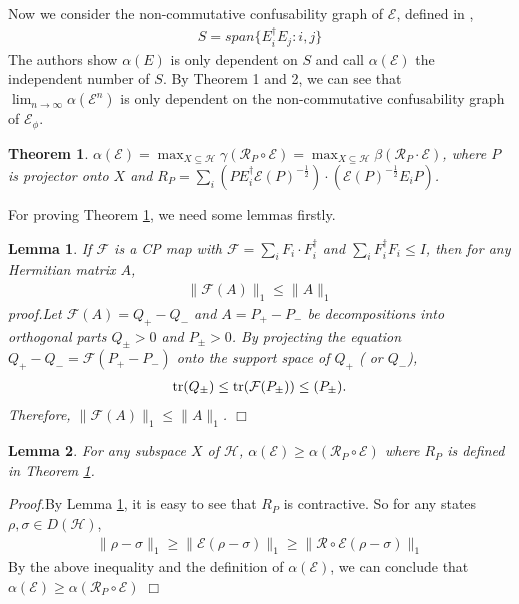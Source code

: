 \documentclass{article}
\def\R{\ensuremath{\mathfrak{R}}}
\def\f{\ensuremath{\mathcal{F}}}
\def\f{\ensuremath{\mathcal{F}}}
\newcommand{\tr}{{\rm tr}}
\def\E{\mathcal{E}}
\def\H{\mathcal{H}}
\def\R{\mathcal{R}}
\newtheorem{theorem}{Theorem}
\newtheorem{lemma}{Lemma}
\begin{document}
Now we consider the non-commutative confusability graph of $\E$, defined in \cite{duan3013zero-error},
\begin{eqnarray*}
S=span\{E_{i}^{\dagger}E_{j}:i,j\}
\end{eqnarray*}
The authors show $\alpha(E)$ is only dependent on $S$ and call $\alpha(\E)$  the independent number of $S$. By Theorem 1 and 2, we can see that $\lim_{n\rightarrow \infty}\alpha(\E^n)$ is only dependent on the non-commutative confusability graph of $\E_{\phi}$.
\begin{theorem}\label{Correct_E}
$\alpha(\E)=\max_{X\subseteq \H}\gamma(\R_{P}\circ \E)=\max_{X\subseteq \H}\beta(\R_{P}\cdot \E)$, where $P$ is projector onto $X$ and $R_{P}=\sum_{i}(PE_{i}^{\dagger}\E(P)^{-\frac{1}{2}})\cdot(\E(P)^{-\frac{1}{2}}E_{i}P)$.
\end{theorem}
For proving Theorem \ref{Correct_E}, we need some lemmas firstly. 
\begin{lemma}\label{R}
If $\f$ is a CP map with $\f=\sum_{i}F_{i}\cdot F_{i}^{\dagger}$ and $\sum_{i}F_{i}^{\dagger}F_{i}\leq I$, then for any Hermitian matrix $A$, 
\begin{eqnarray*}
\| \f(A)\|_{1}\leq \|A\|_{1}
\end{eqnarray*}
{\it proof.}Let $\f(A)=Q_{+}-Q_{-}$ and $A=P_{+}-P_{-}$ be decompositions into orthogonal parts $Q_{\pm}>0$ and $P_{\pm}>0$. By projecting the equation  $Q_{+}-Q_{-}=\f(P_{+}-P_{-})$ onto the support space of $Q_{+}$ ( or $Q_{-}$),
\begin{eqnarray*}
\tr(Q_{\pm})\leq \tr(\f(P_{\pm}))\leq(P_{\pm}).
\end{eqnarray*}
 Therefore, $\| \f(A)\|_{1}\leq \|A\|_{1}$.
\hfill $\Box$
\end{lemma}
\begin{lemma}\label{R_inequa}
For any subspace $X$ of $\H$, $\alpha(\E)\geq\alpha(\R_{P}\circ \E)$ where $R_{P}$ is defined in Theorem \ref{Correct_E}.
\end{lemma}
{\it Proof.}By Lemma \ref{R}, it is easy to see that $R_{P}$ is contractive. So for any states $\rho,\sigma\in D(\H)$,  
\begin{eqnarray*}
\|\rho-\sigma\|_{1} \geq\| \E(\rho-\sigma)\|_{1}\geq \| \R\circ \E(\rho-\sigma)\|_{1}
\end{eqnarray*}
 By the above inequality and the definition of $\alpha(\E)$, we can conclude that $\alpha(\E)\geq\alpha(\R_{P}\circ \E)$
\hfill $\Box$\\
\\
\end{document}
